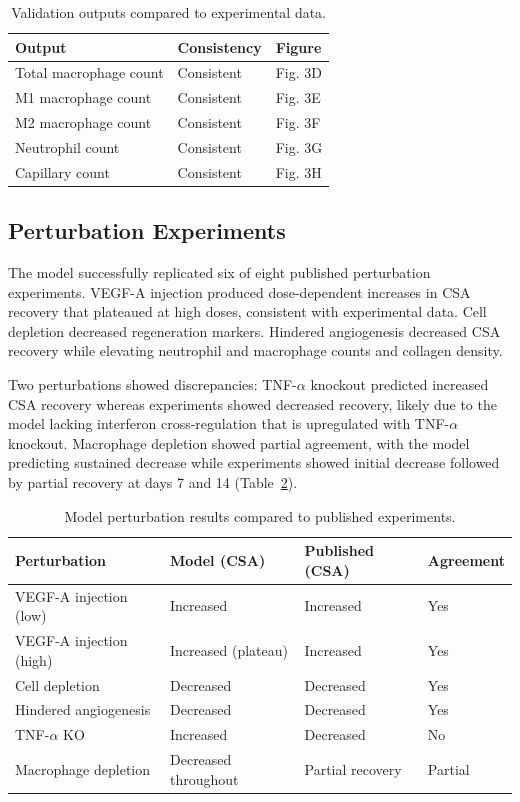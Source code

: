 \documentclass[11pt]{article}
\begin{document}
\begin{table}[htbp]
\centering
\caption{Validation outputs compared to experimental data.}
\label{tab:validation}
\begin{tabular}{lll}
\toprule
Output & Consistency & Figure \\
\midrule
Total macrophage count & Consistent & Fig. 3D \\
M1 macrophage count & Consistent & Fig. 3E \\
M2 macrophage count & Consistent & Fig. 3F \\
Neutrophil count & Consistent & Fig. 3G \\
Capillary count & Consistent & Fig. 3H \\
\bottomrule
\end{tabular}
\end{table}

\subsection{Perturbation Experiments}

The model successfully replicated six of eight published perturbation experiments. VEGF-A injection produced dose-dependent increases in CSA recovery that plateaued at high doses, consistent with experimental data. Cell depletion decreased regeneration markers. Hindered angiogenesis decreased CSA recovery while elevating neutrophil and macrophage counts and collagen density.

Two perturbations showed discrepancies: TNF-$\alpha$ knockout predicted increased CSA recovery whereas experiments showed decreased recovery, likely due to the model lacking interferon cross-regulation that is upregulated with TNF-$\alpha$ knockout. Macrophage depletion showed partial agreement, with the model predicting sustained decrease while experiments showed initial decrease followed by partial recovery at days 7 and 14 (Table~\ref{tab:perturbations}).

\begin{table}[htbp]
\centering
\caption{Model perturbation results compared to published experiments.}
\label{tab:perturbations}
\begin{tabular}{llll}
\toprule
Perturbation & Model (CSA) & Published (CSA) & Agreement \\
\midrule
VEGF-A injection (low) & Increased & Increased & Yes \\
VEGF-A injection (high) & Increased (plateau) & Increased & Yes \\
Cell depletion & Decreased & Decreased & Yes \\
Hindered angiogenesis & Decreased & Decreased & Yes \\
TNF-$\alpha$ KO & Increased & Decreased & No \\
Macrophage depletion & Decreased throughout & Partial recovery & Partial \\
\bottomrule
\end{tabular}
\end{table}
\end{document}
